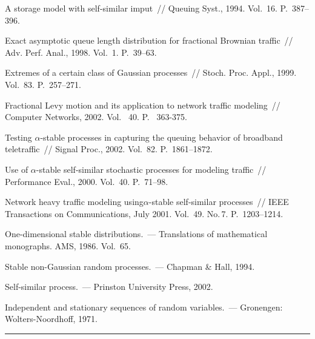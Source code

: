 \begin{multicols}{2}
{{\begin{thebibliography}{99}
 A storage model with self-similar imput~// 
Queuing Syst., 1994. Vol.~16. P.~387--396. 

 Exact asymptotic queue length distribution for fractional Brownian traffic~//
  Adv. Perf. Anal., 1998. Vol.~1. P.~39--63.

 Extremes of a certain class of Gaussian processes~// 
Stoch. Proc. Appl., 1999. Vol.~83. P.~257--271.

Fractional Levy motion and its application to network traffic modeling~// 
Computer Networks, 2002. Vol.~ 40. P.~ 363-375. 

Testing $\alpha$-stable processes in capturing the queuing behavior of
broadband teletraffic~// Signal Proc., 2002. Vol.~82.  P.~1861--1872.  

  Use of $\alpha$-stable 
self-similar stochastic processes for modeling traffic~//  Performance Eval., 
2000. Vol.~40. P.~71--98.

 Network heavy traffic modeling using\linebreak $\alpha$-stable
self-similar processes~// IEEE Transactions on  Communications, July 2001. Vol.~49. No.\,7. 
P.~1203--1214.


 One-dimensional stable distributions.~--- 
Translations of mathematical monographs.  AMS, 1986. Vol.~65.

 Stable
non-Gaussian random processes.~---  Chapman \& Hall, 1994. 

 Self-similar process.~---
Prinston University Press, 2002. 

  Independent and stationary sequences of 
random variables.~--- Gronengen: Wolters-Noordhoff, 1971. 

 \end{thebibliography}
}
}


\end{multicols}

\vspace*{3pt}

\hrule

